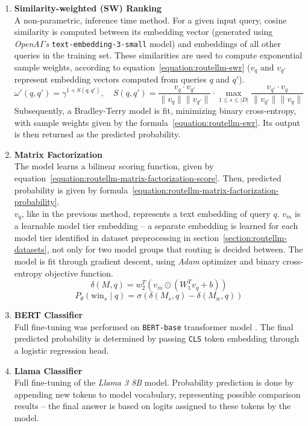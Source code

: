 \documentclass[a4paper,11pt,twoside]{report}
\theoremstyle{definition}
\begin{document}
\begin{enumerate}
    \item \textbf{Similarity-weighted (SW) Ranking} \\
    A non-parametric, inference time method. For a given input query, cosine similarity is computed between its embedding vector (generated using \textit{OpenAI's} \texttt{text-embedding-3-small} model) and embeddings of all other queries in the training set. These similarities are used to compute exponential sample weights, according to equation~\ref{equation:routellm-swr} ($v_q$ and $v_{q'}$ represent embedding vectors computed from queries $q$ and $q'$).
    \begin{equation}
    \label{equation:routellm-swr}
        \omega'(q, q') = \gamma^{1 + S(q, q')}, \quad S(q, q') = \frac{v_q \cdot v_{q'}}{\|v_q\|\|v_{q'}\|} \cdot \max_{1 \le s \le |D|} \frac{v_{q'} \cdot v_q}{\|v_{q'}\|\|v_q\|}
    \end{equation}
    Subsequently, a Bradley-Terry model is fit, minimizing binary cross-entropy, with sample weights given by the formula~\ref{equation:routellm-swr}. Its output is then returned as the predicted probability.
    \item \textbf{Matrix Factorization} \\
    The model learns a bilinear scoring function, given by equation~\ref{equation:routellm-matrix-factorization-score}. Then, predicted probability is given by formula~\ref{equation:routellm-matrix-factorization-probability}. \\
    $v_q$, like in the previous method, represents a text embedding of query $q$. $v_m$ is a learnable model tier embedding -- a separate embedding is learned for each model tier identified in dataset preprocessing in section~\ref{section:routellm-datasets}, not only for two model groups that routing is decided between. The model is fit through gradient descent, using \textit{Adam} optimizer and binary cross-entropy objective function.
    \begin{equation}
    \label{equation:routellm-matrix-factorization-score}
        \delta(M, q) = w_2^T \left( v_m \odot (W_1^T v_q + b) \right)
    \end{equation}
    \begin{equation}
    \label{equation:routellm-matrix-factorization-probability}
        P_\theta(\text{win}_s \mid q) = \sigma\left(\delta(M_s, q) - \delta(M_w, q)\right)
    \end{equation}
    \item \textbf{BERT Classifier} \\
    Full fine-tuning was performed on \texttt{BERT-base} transformer model \cite{devlin2019bert}. The final predicted probability is determined by passing \texttt{CLS} token embedding through a logistic regression head. 
    \item \textbf{Llama Classifier} \\
    Full fine-tuning of the \textit{Llama 3 8B} model. Probability prediction is done by appending new tokens to model vocabulary, representing possible comparison results -- the final answer is based on logits assigned to these tokens by the model. 
\end{enumerate}
\end{document}
